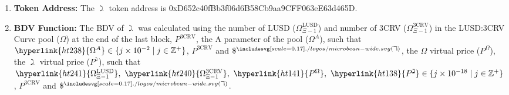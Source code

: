 \documentclass[class=article, crop=false]{standalone}
\begin{document}
   \begin{enumerate}
        \item \textbf{Token Address:} The \hyperlink{ht108}{$\gimel$} token address is 0xD652c40fBb3f06d6B58Cb9aa9CFF063eE63d465D.
        \item \textbf{BDV Function:} The BDV of \hyperlink{ht108}{$\gimel$} was calculated using the number of LUSD (\hyperlink{ht241}{$\Omega_{\Xi-1}^{\text{LUSD}}$}) and number of 3CRV (\hyperlink{ht240}{$\Omega_{\Xi-1}^{\text{3CRV}}$}) in the LUSD:3CRV Curve pool (\hyperlink{ht237}{$\Omega$}) at the end of the last block, \hyperlink{ht136}{$P^{\text{3CRV}}$}, the A parameter of the pool (\hyperlink{ht238}{$\Omega^{A}$}), such that $\hyperlink{ht238}{\Omega^{A}} \in \{j \times 10^{-2} \mid j \in \mathbb{Z}^{+} \}$, \hyperlink{ht136}{$P^{\text{3CRV}}$} and \hyperlink{ht1a}{$\$^{\bean(\daleth)}$}, the \hyperlink{ht237}{$\Omega$} virtual price (\hyperlink{ht141}{$P^{\Omega}$}), the \hyperlink{ht108}{$\gimel$} virtual price (\hyperlink{ht138}{$P^{\gimel}$}), such that $\hyperlink{ht241}{\Omega_{\Xi-1}^{\text{LUSD}}},\ \hyperlink{ht240}{\Omega_{\Xi-1}^{\text{3CRV}}},\ \hyperlink{ht141}{P^{\Omega}},\ \hyperlink{ht138}{P^{\gimel}} \in \{j \times 10^{-18} \mid j \in \mathbb{Z}^{+} \}$, \hyperlink{ht136}{$P^{\text{3CRV}}$} and \hyperlink{ht1a}{$\$^{\bean(\daleth)}$}. 


\end{enumerate}
\end{document}
